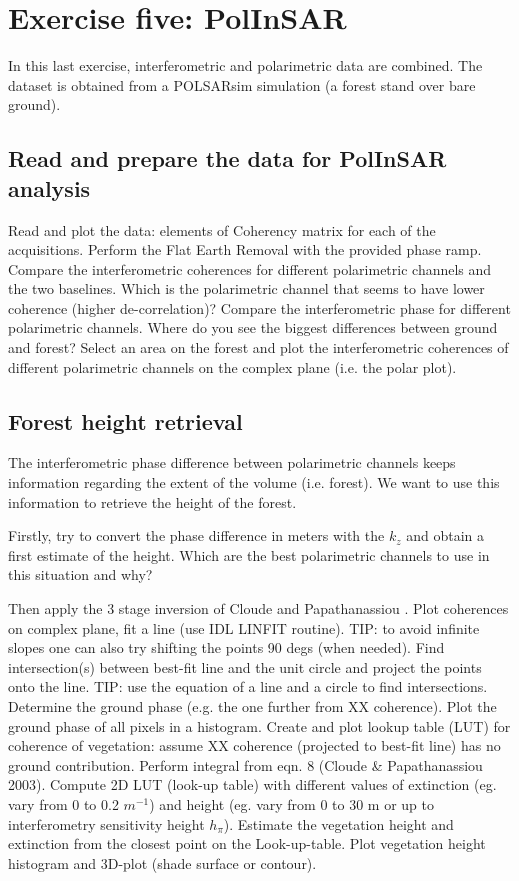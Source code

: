 \newpage
\section{Exercise five: PolInSAR}
In this last exercise, interferometric and polarimetric data are combined. The dataset is obtained from a POLSARsim simulation (a forest stand over bare ground).

\subsection{Read and prepare the data for PolInSAR analysis}
Read and plot the data: elements of Coherency matrix for each of the acquisitions. Perform the Flat Earth Removal with the provided phase ramp. Compare the interferometric coherences for different polarimetric channels and the two baselines. Which is the polarimetric channel that seems to have lower coherence (higher de-correlation)? Compare the interferometric phase for different polarimetric channels. Where do you see the biggest differences between ground and forest? Select an area on the forest and plot the interferometric coherences of different polarimetric channels on the complex plane (i.e. the polar plot).

\subsection{Forest height retrieval}
The interferometric phase difference between polarimetric channels keeps information regarding the extent of the volume (i.e. forest). We want to use this information to retrieve the height of the forest.

Firstly, try to convert the phase difference in meters with the $k_z$ and obtain a first estimate of the height. Which are the best polarimetric channels to use in this situation and why?

Then apply the 3 stage inversion of  Cloude and Papathanassiou \cite{cloude03}. Plot coherences on complex plane, fit a line (use IDL LINFIT routine). TIP: to avoid infinite slopes one can also try shifting the points 90 degs (when needed). Find intersection(s) between best-fit line and the unit circle and project the points onto the line. TIP: use the equation of a line and a circle to find intersections. Determine the ground phase (e.g. the one further from XX coherence). Plot the ground phase of all pixels in a histogram. Create and plot lookup table (LUT) for coherence of vegetation: assume XX coherence (projected to best-fit line) has no ground contribution. Perform integral from eqn. 8 (Cloude \& Papathanassiou 2003). Compute 2D LUT (look-up table) with different values of extinction (eg. vary from 0 to 0.2 $m^{-1}$) and height (eg. vary from 0 to 30 m or up to interferometry sensitivity height $h_\pi$). Estimate the vegetation height and extinction from the closest point on the Look-up-table. Plot vegetation height histogram and 3D-plot (shade surface or contour).

